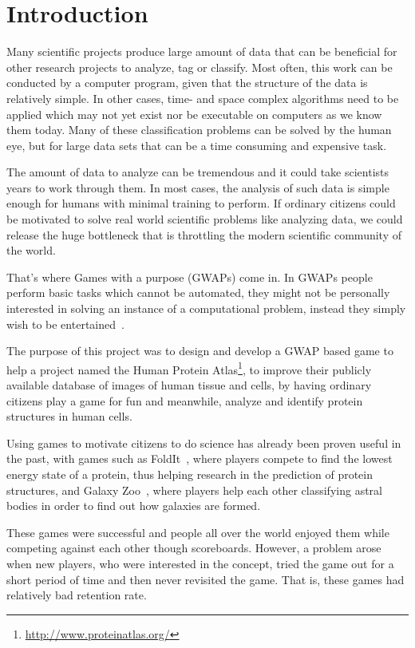 \section{Introduction}\label{sec:introduction}

Many scientific projects produce large amount of data that can be beneficial for other research projects to analyze, tag or classify. Most often, this work can be conducted by a computer program, given that the structure of the data is relatively simple. In other cases, time- and space complex algorithms need to be applied which may not yet exist nor be executable on computers as we know them today. Many of these classification problems can be solved by the human eye, but for large data sets that can be a time consuming and expensive task.

The amount of data to analyze can be tremendous and it could take scientists years to work through them. In most cases, the analysis of such data is simple enough for humans with minimal training to perform. If ordinary citizens could be motivated to solve real world scientific problems like analyzing data, we could release the huge bottleneck that is throttling the modern scientific community of the world.

That's where Games with a purpose (GWAPs) come in. In GWAPs people perform basic tasks which cannot be automated, they might not be personally interested in solving an instance of a computational problem, instead they simply wish to be entertained~\cite{GWAP}.

The purpose of this project was to design and develop a GWAP based game to help a project named the Human Protein Atlas\footnote{\url{http://www.proteinatlas.org/}}, to improve their publicly available database of images of human tissue and cells, by having ordinary citizens play a game for fun and meanwhile, analyze and identify protein structures in human cells.

Using games to motivate citizens to do science has already been proven useful in the past, with games such as FoldIt~\cite{foldit}, where players compete to find the lowest energy state of a protein, thus helping research in the prediction of protein structures, and Galaxy Zoo~\cite{galaxyzoo}, where players help each other classifying astral bodies in order to find out how galaxies are formed.

These games were successful and people all over the world enjoyed them while competing against each other though scoreboards. However, a problem arose when new players, who were interested in the concept, tried the game out for a short period of time and then never revisited the game. That is, these games had relatively bad retention rate.

